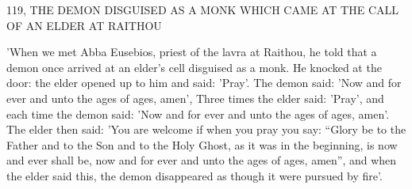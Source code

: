 119, THE DEMON DISGUISED AS A MONK WHICH
CAME AT THE CALL OF AN ELDER AT RAITHOU

'When we met Abba Eusebios, priest of the lavra at Raithou, he told
that a demon once arrived at an elder's cell disguised as a monk. He
knocked at the door: the elder opened up to him and said: 'Pray'.
The demon said: 'Now and for ever and unto the ages of ages,
amen', Three times the elder said: 'Pray', and each time the demon
said: 'Now and for ever and unto the ages of ages, amen'. The elder
then said: 'You are welcome if when you pray you say: “Glory be
to the Father and to the Son and to the Holy Ghost, as it was in
the beginning, is now and ever shall be, now and for ever and unto
the ages of ages, amen”, and when the elder said this, the demon
disappeared as though it were pursued by fire'.

